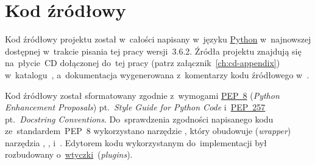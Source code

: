 \documentclass[thesis]{subfiles}
\begin{document}

\section{Kod źródłowy}

Kod źródłowy projektu został w~całości napisany w~języku \href{https://en.wikipedia.org/wiki/Python_(programming_language)}{Python} w~najnowszej dostępnej w~trakcie pisania tej pracy wersji~3.6.2. Źródła projektu znajdują się na~płycie~CD dołączonej do~tej pracy (patrz załącznik~\ref{ch:cd-appendix}) w~katalogu~, a~dokumentacja wygenerowana z~komentarzy kodu źródłowego w~.

Kod źródłowy został sformatowany zgodnie z~wymogami \href{https://www.python.org/dev/peps/pep-0008/}{PEP~8} (\emph{Python Enhancement Proposals}) pt.~\emph{Style Guide for Python Code} i~\href{https://www.python.org/dev/peps/pep-0257/}{PEP~257} pt.~\emph{Docstring Conventions}. Do~sprawdzenia zgodności napisanego kodu ze~standardem~PEP~8 wykorzystano narzędzie , który obudowuje (\emph{wrapper}) narzędzia , ,  i~. Edytorem kodu wykorzystanym do~implementacji był  rozbudowany o~\href{http://vimawesome.com/}{wtyczki}~(\emph{plugins}).
\end{document}
